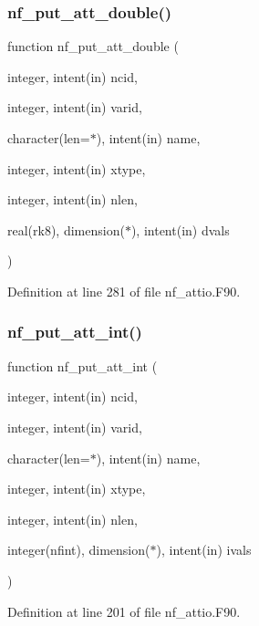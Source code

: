 \subsubsection{\texorpdfstring{nf\+\_\+put\+\_\+att\+\_\+double()}{nf\_put\_att\_double()}}
{\footnotesize\ttfamily function nf\+\_\+put\+\_\+att\+\_\+double (\begin{DoxyParamCaption}\item[{integer, intent(in)}]{ncid,  }\item[{integer, intent(in)}]{varid,  }\item[{character(len=$\ast$), intent(in)}]{name,  }\item[{integer, intent(in)}]{xtype,  }\item[{integer, intent(in)}]{nlen,  }\item[{real(rk8), dimension($\ast$), intent(in)}]{dvals }\end{DoxyParamCaption})}



Definition at line 281 of file nf\+\_\+attio.\+F90.

\mbox{\label{nf__attio_8F90_ab2a527a5b813ced347f63c07c60f2f7a}} 
\subsubsection{\texorpdfstring{nf\+\_\+put\+\_\+att\+\_\+int()}{nf\_put\_att\_int()}}
{\footnotesize\ttfamily function nf\+\_\+put\+\_\+att\+\_\+int (\begin{DoxyParamCaption}\item[{integer, intent(in)}]{ncid,  }\item[{integer, intent(in)}]{varid,  }\item[{character(len=$\ast$), intent(in)}]{name,  }\item[{integer, intent(in)}]{xtype,  }\item[{integer, intent(in)}]{nlen,  }\item[{integer(nfint), dimension($\ast$), intent(in)}]{ivals }\end{DoxyParamCaption})}



Definition at line 201 of file nf\+\_\+attio.\+F90.

\mbox{\label{nf__attio_8F90_a28b1e4fbb5cb59152c3752eccae5a35e}} 
